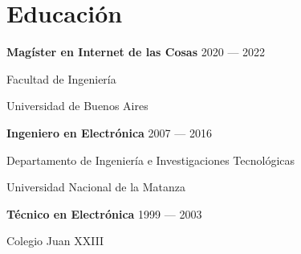 \section{Educación}

\parbox[t][][t]{\linewidth}{
	\parbox{\linewidth}{\textbf{Magíster en Internet de las Cosas} \hfill {{2020 --- 2022}}}
	\parbox{\linewidth}{{Facultad de Ingeniería}}
	\parbox{\linewidth}{{Universidad de Buenos Aires}}
	\smallskip
	\smallskip
}

\parbox[t][][t]{\linewidth}{
	\parbox{\linewidth}{\textbf{Ingeniero en Electrónica} \hfill {{2007 --- 2016}}}
	\parbox{\linewidth}{{Departamento de Ingeniería e Investigaciones Tecnológicas}}
	\parbox{\linewidth}{{Universidad Nacional de la Matanza}}
	\smallskip
	\smallskip
}

\parbox[t][][t]{\linewidth}{
	\parbox{\linewidth}{\textbf{Técnico en Electrónica} \hfill {{1999 --- 2003}}}
	\parbox{\linewidth}{{Colegio Juan XXIII}}
	\smallskip
	\smallskip
}

